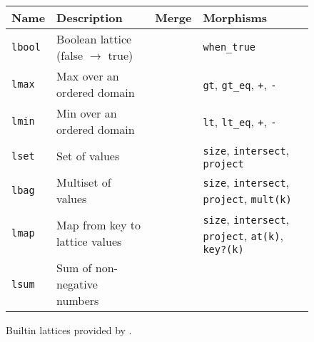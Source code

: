 \begin{figure*}[t]
\begin{tabular}{|l|l|l|l|}
\hline
\textbf{Name} & \textbf{Description} & \textbf{Merge} & \textbf{Morphisms} \\
\hline
\texttt{lbool} & Boolean lattice (false $\to$ true) & & \texttt{when\_true} \\
\texttt{lmax} & Max over an ordered domain & &\texttt{gt},
\texttt{gt\_eq}, \texttt{+}, \texttt{-} \\
\texttt{lmin} & Min over an ordered domain & &\texttt{lt}, \texttt{lt\_eq},
\texttt{+}, \texttt{-} \\
\texttt{lset} & Set of values & &\texttt{size}, \texttt{intersect}, \texttt{project}
\\
\texttt{lbag} & Multiset of values & &\texttt{size}, \texttt{intersect},
\texttt{project}, \texttt{mult(k)}\\
\texttt{lmap} & Map from key to lattice values & &\texttt{size},
\texttt{intersect}, \texttt{project}, \texttt{at(k)}, \texttt{key?(k)} \\
\texttt{lsum} & Sum of non-negative numbers & &\\
\hline
\end{tabular}
\caption{Builtin lattices provided by \lang.}
\label{fig:builtin-lattices}
\end{figure*}